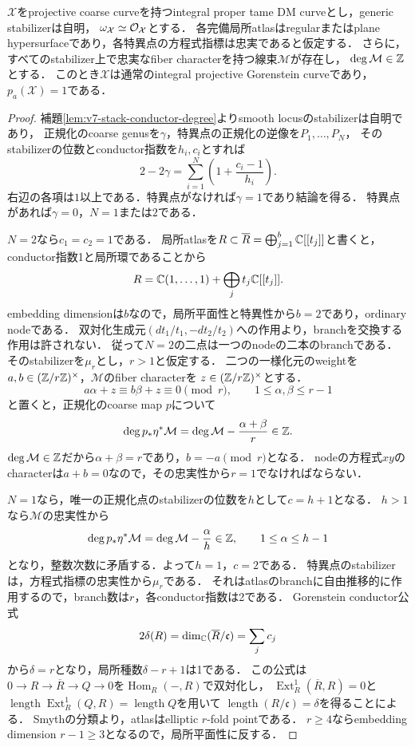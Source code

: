 \documentclass[11pt,a4paper]{ltjsarticle}
\begin{document}
\begin{lemma}[整数次数の忠実な偏極を持つ境界stackの排除]
\label{lem:v8-integral-degree-stack}
$\mathcal X$をprojective coarse curveを持つintegral proper tame DM curveとし，generic stabilizerは自明，
$\omega_{\mathcal X}\simeq\mathcal O_{\mathcal X}$とする．
各完備局所atlasはregularまたはplane hypersurfaceであり，各特異点の方程式指標は忠実であると仮定する．
さらに，すべてのstabilizer上で忠実なfiber characterを持つ線束$\mathcal M$が存在し，
$\deg\mathcal M\in\mathbb Z$とする．
このとき$\mathcal X$は通常のintegral projective Gorenstein curveであり，$p_a(\mathcal X)=1$である．
\end{lemma}
\begin{proof}
補題\ref{lem:v7-stack-conductor-degree}よりsmooth locusのstabilizerは自明であり，
正規化のcoarse genusを$\gamma$，特異点の正規化の逆像を$P_1,\dots,P_N$，
そのstabilizerの位数とconductor指数を$h_i,c_i$とすれば
\[
 2-2\gamma=\sum_{i=1}^N\left(1+\frac{c_i-1}{h_i}\right).
\]
右辺の各項は$1$以上である．特異点がなければ$\gamma=1$であり結論を得る．
特異点があれば$\gamma=0$，$N=1$または$2$である．

$N=2$なら$c_1=c_2=1$である．
局所atlasを$R\subset\overline R=\bigoplus_{j=1}^b\mathbb C[[t_j]]$と書くと，
conductor指数1と局所環であることから
\[
 R=\mathbb C(1,\dots,1)+\bigoplus_j t_j\mathbb C[[t_j]].
\]
embedding dimensionは$b$なので，局所平面性と特異性から$b=2$であり，ordinary nodeである．
双対化生成元$(dt_1/t_1,-dt_2/t_2)$への作用より，branchを交換する作用は許されない．
従って$N=2$の二点は一つのnodeの二本のbranchである．
そのstabilizerを$\mu_r$とし，$r>1$と仮定する．
二つの一様化元のweightを$a,b\in(\mathbb Z/r\mathbb Z)^\times$，$\mathcal M$のfiber characterを
$z\in(\mathbb Z/r\mathbb Z)^\times$とする．
\[
 a\alpha+z\equiv b\beta+z\equiv0\pmod r,
 \qquad 1\leq\alpha,\beta\leq r-1
\]
と置くと，正規化のcoarse map $p$について
\[
 \deg p_*\eta^*\mathcal M
 =\deg\mathcal M-\frac{\alpha+\beta}{r}\in\mathbb Z.
\]
$\deg\mathcal M\in\mathbb Z$だから$\alpha+\beta=r$であり，$b=-a\pmod r$となる．
nodeの方程式$xy$のcharacterは$a+b=0$なので，その忠実性から$r=1$でなければならない．

$N=1$なら，唯一の正規化点のstabilizerの位数を$h$として$c=h+1$となる．
$h>1$なら$\mathcal M$の忠実性から
\[
 \deg p_*\eta^*\mathcal M=\deg\mathcal M-\frac{\alpha}{h}\in\mathbb Z,
 \qquad 1\leq\alpha\leq h-1
\]
となり，整数次数に矛盾する．よって$h=1$，$c=2$である．
特異点のstabilizerは，方程式指標の忠実性から$\mu_r$である．
それはatlasのbranchに自由推移的に作用するので，branch数は$r$，各conductor指数は2である．
Gorenstein conductor公式
\[
 2\delta(R)=\dim_\mathbb C(\overline R/\mathfrak c)=\sum_jc_j
\]
から$\delta=r$となり，局所種数$\delta-r+1$は1である．
この公式は$0\to R\to\overline R\to Q\to0$を$\operatorname{Hom}_R(-,R)$で双対化し，
$\operatorname{Ext}^1_R(\overline R,R)=0$と
$\operatorname{length}\operatorname{Ext}^1_R(Q,R)=\operatorname{length}Q$を用いて
$\operatorname{length}(R/\mathfrak c)=\delta$を得ることによる．
Smythの分類\cite[Appendix A, Proposition A.3]{SmythGenusOne}より，atlasはelliptic $r$-fold pointである．
$r\geq4$ならembedding dimension $r-1\geq3$となるので，局所平面性に反する．


\end{proof}
\end{document}
